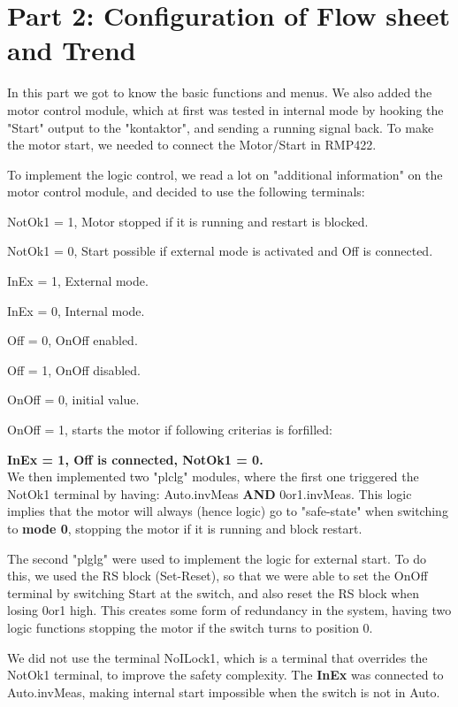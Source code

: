 \section{Part 2: Configuration of Flow sheet and Trend}

In this part we got to know the basic functions and menus. We also added the motor control module, which at first was tested in internal mode by hooking the "Start" output to the "kontaktor", and sending a running signal back. To make the motor start, we needed to connect the Motor/Start in RMP422.

To implement the logic control, we read a lot on "additional information" on the motor control module, and decided to use the following terminals:

NotOk1 = 1, Motor stopped if it is running and restart is blocked.

NotOk1 = 0, Start possible if external mode is activated and Off is connected.

InEx = 1, External mode.

InEx = 0, Internal mode.

Off = 0, OnOff enabled.

Off = 1, OnOff disabled.

OnOff = 0, initial value.

OnOff = 1, starts the motor if following criterias is forfilled: 

\textbf{InEx = 1, Off is connected, NotOk1 = 0.}\\

\newpage
We then implemented two "plclg" modules, where the first one triggered the NotOk1 terminal by having: Auto.invMeas \textbf{AND} 0or1.invMeas. This logic implies that the motor will always (hence logic) go to "safe-state" when switching to \textbf{mode 0}, stopping the motor if it is running and block restart.

The second "plglg" were used to implement the logic for external start. To do this, we used the RS block (Set-Reset), so that we were able to set the OnOff terminal by switching Start at the switch, and also reset the RS block when losing 0or1 high. This creates some form of redundancy in the system, having two logic functions stopping the motor if the switch turns to position 0.

We did not use the terminal NoILock1, which is a terminal that overrides the NotOk1 terminal, to improve the safety complexity. The \textbf{InEx} was connected to Auto.invMeas, making internal start impossible when the switch is not in Auto.

